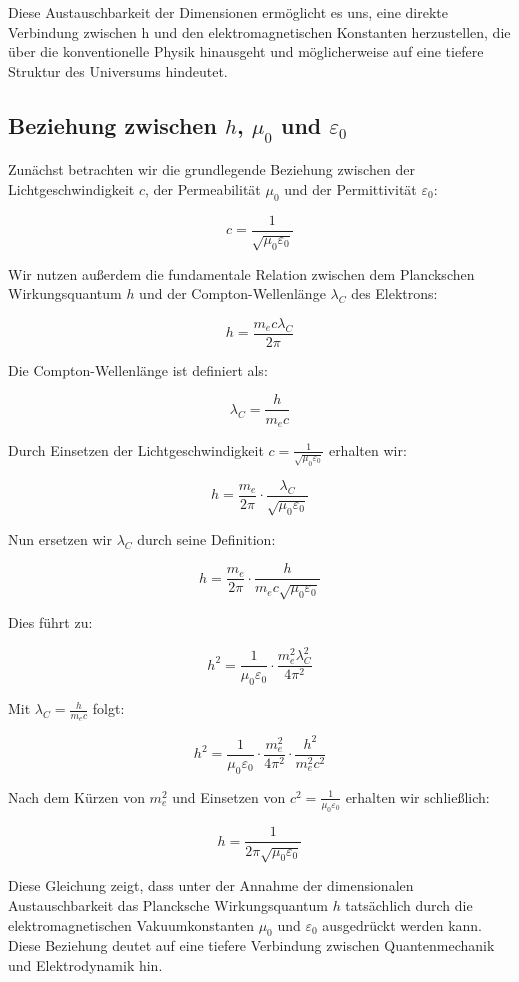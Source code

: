 \documentclass{article}
\begin{document}
	Diese Austauschbarkeit der Dimensionen ermöglicht es uns, eine direkte Verbindung zwischen h und den elektromagnetischen Konstanten herzustellen, die über die konventionelle Physik hinausgeht und möglicherweise auf eine tiefere Struktur des Universums hindeutet.
	
	\subsection{Beziehung zwischen $h$, $\mu_0$ und $\varepsilon_0$}
	
	Zunächst betrachten wir die grundlegende Beziehung zwischen der Lichtgeschwindigkeit $c$, der Permeabilität $\mu_0$ und der Permittivität $\varepsilon_0$:
	
	$$c = \frac{1}{\sqrt{\mu_0\varepsilon_0}}$$
	
	Wir nutzen außerdem die fundamentale Relation zwischen dem Planckschen Wirkungsquantum $h$ und der Compton-Wellenlänge $\lambda_C$ des Elektrons:
	
	$$h = \frac{m_e c \lambda_C}{2\pi}$$
	
	Die Compton-Wellenlänge ist definiert als:
	
	$$\lambda_C = \frac{h}{m_e c}$$
	
	Durch Einsetzen der Lichtgeschwindigkeit $c = \frac{1}{\sqrt{\mu_0\varepsilon_0}}$ erhalten wir:
	
	$$h = \frac{m_e}{2\pi} \cdot \frac{\lambda_C}{\sqrt{\mu_0\varepsilon_0}}$$
	
	Nun ersetzen wir $\lambda_C$ durch seine Definition:
	
	$$h = \frac{m_e}{2\pi} \cdot \frac{h}{m_e c \sqrt{\mu_0\varepsilon_0}}$$
	
	Dies führt zu:
	
	$$h^2 = \frac{1}{\mu_0\varepsilon_0} \cdot \frac{m_e^2 \lambda_C^2}{4\pi^2}$$
	
	Mit $\lambda_C = \frac{h}{m_e c}$ folgt:
	
	$$h^2 = \frac{1}{\mu_0\varepsilon_0} \cdot \frac{m_e^2}{4\pi^2} \cdot \frac{h^2}{m_e^2c^2}$$
	
	Nach dem Kürzen von $m_e^2$ und Einsetzen von $c^2 = \frac{1}{\mu_0\varepsilon_0}$ erhalten wir schließlich:
	
	$$h = \frac{1}{2\pi\sqrt{\mu_0\varepsilon_0}}$$
	
	Diese Gleichung zeigt, dass unter der Annahme der dimensionalen Austauschbarkeit das Plancksche Wirkungsquantum $h$ tatsächlich durch die elektromagnetischen Vakuumkonstanten $\mu_0$ und $\varepsilon_0$ ausgedrückt werden kann. Diese Beziehung deutet auf eine tiefere Verbindung zwischen Quantenmechanik und Elektrodynamik hin.
	
\end{document}
